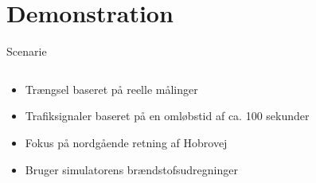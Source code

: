 \section{Demonstration}
\begin{frame}{Scenarie}
\begin{columns}
\begin{column}{0.6\textwidth}
\begin{itemize}
\item Trængsel baseret på reelle målinger
\item Trafiksignaler baseret på en omløbstid af ca. 100 sekunder
\item Fokus på nordgående retning af Hobrovej
\item Bruger simulatorens brændstofsudregninger
\end{itemize}
\end{column}


\end{columns}
\end{frame}
